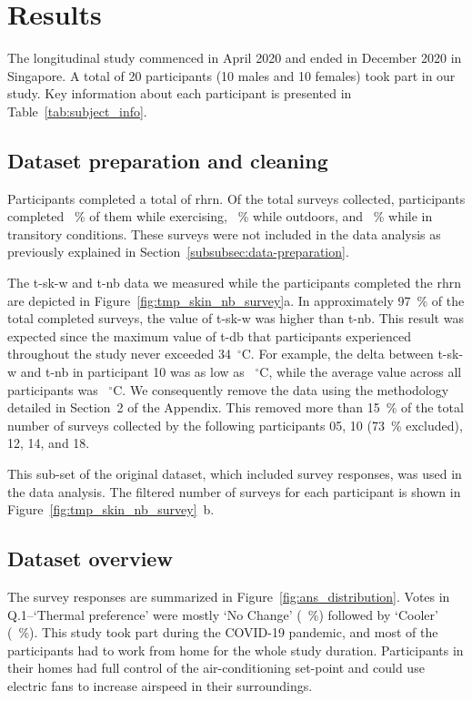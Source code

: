 \section{Results}\label{sec:results}
The longitudinal study commenced in April 2020 and ended in December 2020 in Singapore.
A total of 20 participants (10 males and 10 females) took part in our study.
Key information about each participant is presented in Table~\ref{tab:subject_info}.



\subsection{Dataset preparation and cleaning}\label{subsec:datasetPreparationAndCleaning}
Participants completed a total of  \ac{rhrn}.
Of the total surveys collected, participants completed ~\% of them while exercising, ~\% while outdoors, and ~\% while in transitory conditions.
These surveys were not included in the data analysis as previously explained in Section~\ref{subsubsec:data-preparation}.

The \ac{t-sk-w} and \ac{t-nb} data we measured while the participants completed the \ac{rhrn} are depicted in Figure~\ref{fig:tmp_skin_nb_survey}a\@.
In approximately 97~\% of the total completed surveys, the value of \ac{t-sk-w} was higher than \ac{t-nb}.
This result was expected since the maximum value of \ac{t-db} that participants experienced throughout the study never exceeded 34~$^{\circ}$C\@.
For example, the delta between \ac{t-sk-w} and \ac{t-nb} in participant 10 was as low as ~$^{\circ}$C\@, while the average value across all participants was ~$^{\circ}$C\@.
We consequently remove the data using the methodology detailed in Section~2 of the Appendix.
This removed more than 15~\% of the total number of surveys collected by the following participants 05, 10 (73~\% excluded), 12, 14, and 18.

This sub-set of the original dataset, which included  survey responses, was used in the data analysis.
The filtered number of surveys for each participant is shown in Figure~\ref{fig:tmp_skin_nb_survey}~b\@.

\subsection{Dataset overview}\label{subsec:datasetOverview}
The  survey responses are summarized in Figure~\ref{fig:ans_distribution}.
Votes in Q.1--`Thermal preference' were mostly `No Change' (~\%) followed by `Cooler' (~\%).
This study took part during the COVID-19 pandemic, and most of the participants had to work from home for the whole study duration.
Participants in their homes had full control of the air-conditioning set-point and could use electric fans to increase airspeed in their surroundings.


